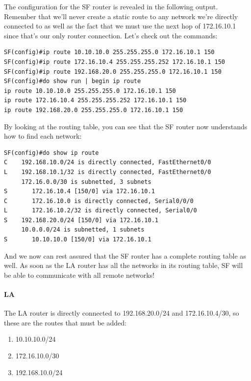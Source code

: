 The configuration for the SF router is revealed in the following output.
Remember that we'll never create a static route to any network we're
directly connected to as well as the fact that we must use the next hop
of 172.16.10.1 since that's our only router connection. Let's check out
the commands:

\begin{verbatim}
SF(config)#ip route 10.10.10.0 255.255.255.0 172.16.10.1 150
SF(config)#ip route 172.16.10.4 255.255.255.252 172.16.10.1 150
SF(config)#ip route 192.168.20.0 255.255.255.0 172.16.10.1 150
SF(config)#do show run | begin ip route
ip route 10.10.10.0 255.255.255.0 172.16.10.1 150
ip route 172.16.10.4 255.255.255.252 172.16.10.1 150
ip route 192.168.20.0 255.255.255.0 172.16.10.1 150
\end{verbatim}

By looking at the routing table, you can see that the SF router now
understands how to find each network:

\begin{verbatim}
SF(config)#do show ip route
C    192.168.10.0/24 is directly connected, FastEthernet0/0
L    192.168.10.1/32 is directly connected, FastEthernet0/0
     172.16.0.0/30 is subnetted, 3 subnets
S       172.16.10.4 [150/0] via 172.16.10.1
C       172.16.10.0 is directly connected, Serial0/0/0
L       172.16.10.2/32 is directly connected, Serial0/0
S    192.168.20.0/24 [150/0] via 172.16.10.1
     10.0.0.0/24 is subnetted, 1 subnets
S       10.10.10.0 [150/0] via 172.16.10.1
\end{verbatim}

And we now can rest assured that the SF router has a complete routing
table as well. As soon as the LA router has all the networks in its
routing table, SF will be able to communicate with all remote networks!

\paragraph{LA}

The LA router is directly connected to 192.168.20.0/24 and
172.16.10.4/30, so these are the routes that must be added:

\begin{enumerate}
\tightlist
\item
  10.10.10.0/24
\item
  172.16.10.0/30
\item
  192.168.10.0/24
\end{enumerate}

